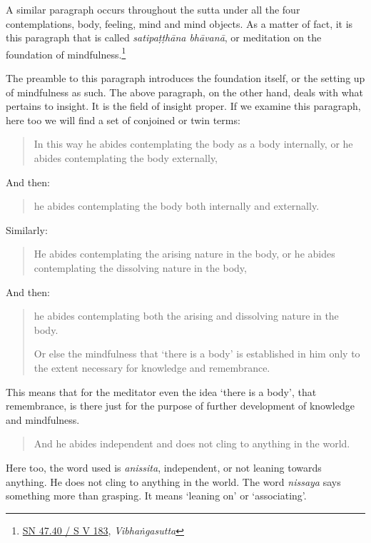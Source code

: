 A similar paragraph occurs throughout the sutta under all the four contemplations, body, feeling, mind and mind objects. As a matter of fact, it is this paragraph that is called \emph{satipaṭṭhāna bhāvanā}, or meditation on the foundation of mindfulness.\footnote{\href{https://suttacentral.net/sn47.40/pli/ms}{SN 47.40 / S V 183}, \emph{Vibhaṅgasutta}}

The preamble to this paragraph introduces the foundation itself, or the setting up of mindfulness as such. The above paragraph, on the other hand, deals with what pertains to insight. It is the field of insight proper. If we examine this paragraph, here too we will find a set of conjoined or twin terms:

\begin{quote}
In this way he abides contemplating the body as a body internally, or he abides contemplating the body externally,
\end{quote}

And then:

\begin{quote}
he abides contemplating the body both internally and externally.
\end{quote}

Similarly:

\begin{quote}
He abides contemplating the arising nature in the body, or he abides contemplating the dissolving nature in the body,
\end{quote}

And then:

\begin{quote}
he abides contemplating both the arising and dissolving nature in the body.

Or else the mindfulness that `there is a body' is established in him only to the extent necessary for knowledge and remembrance.
\end{quote}

This means that for the meditator even the idea `there is a body', that remembrance, is there just for the purpose of further development of knowledge and mindfulness.

\begin{quote}
And he abides independent and does not cling to anything in the world.
\end{quote}

Here too, the word used is \emph{anissita}, independent, or not leaning towards anything. He does not cling to anything in the world. The word \emph{nissaya} says something more than grasping. It means `leaning on' or `associating'.

